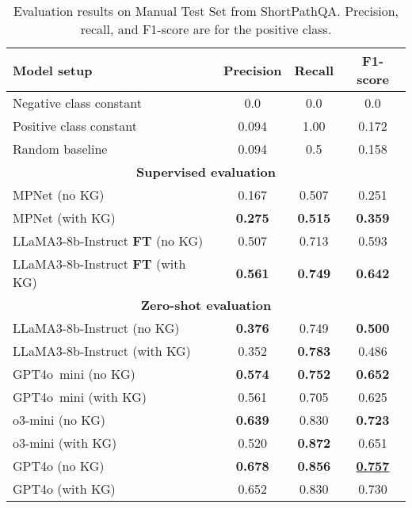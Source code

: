 \begin{table}[ht!]
    \caption{Evaluation results on Manual Test Set from ShortPathQA. Precision, recall, and F1-score are for the positive class.}
    \label{tab:controllable_fusion:shortpathqa:res_baselines_manual}
    \centering
    \begin{tabular}{lccc}
        \toprule
        \textbf{Model setup} & \textbf{Precision} & \textbf{Recall} & \textbf{F1-score} \\
        \midrule
        Negative class constant & 0.0 & 0.0 & 0.0 \\
        Positive class constant & 0.094 &  1.00 & 0.172 \\
        Random baseline & 0.094 &  0.5 & 0.158 \\
        \midrule
        \multicolumn{4}{c}{\textbf{Supervised evaluation}} \\
        \midrule
        MPNet (no KG)  & 0.167 & 0.507 & 0.251 \\
        MPNet (with KG)  & \textbf{0.275} & \textbf{0.515} & \textbf{0.359} \\
        \hline
        LLaMA3-8b-Instruct \textbf{FT} (no KG)  & 0.507 & 0.713 & 0.593 \\
        LLaMA3-8b-Instruct \textbf{FT} (with KG) & \textbf{0.561} & \textbf{0.749} & \textbf{0.642} \\
        \midrule
        \multicolumn{4}{c}{\textbf{Zero-shot evaluation}} \\
        \midrule
        LLaMA3-8b-Instruct (no KG)  & \textbf{0.376} & 0.749 & \textbf{0.500} \\
        LLaMA3-8b-Instruct (with KG)  & 0.352 & \textbf{0.783} & 0.486 \\
        \hline
        GPT4o~mini (no KG)  & \textbf{0.574} & \textbf{0.752} & \textbf{0.652} \\
        GPT4o~mini (with KG) & 0.561 & 0.705 & 0.625 \\
        \hline
        o3-mini (no KG)  & \textbf{0.639} & 0.830 & \textbf{0.723} \\
        o3-mini (with KG)  & 0.520 & \textbf{0.872} & 0.651 \\
        \hline
        GPT4o (no KG)  & \textbf{0.678} & \textbf{0.856} & \textbf{\underline{0.757}} \\
        GPT4o (with KG)  & 0.652 & 0.830 & 0.730 \\
        \bottomrule
    \end{tabular}
\end{table}



